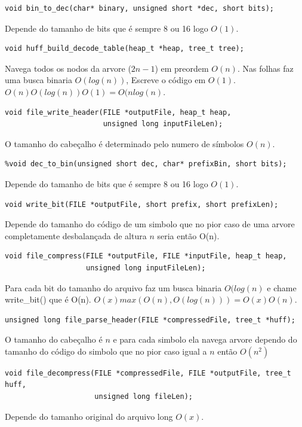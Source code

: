 \documentclass[a4paper, 11pt]{article}
\begin{document}
\begin{verbatim}
void bin_to_dec(char* binary, unsigned short *dec, short bits);
\end{verbatim} 
Depende do tamanho de bits que é sempre 8 ou 16 logo $O(1)$.

\begin{verbatim}
void huff_build_decode_table(heap_t *heap, tree_t tree);
\end{verbatim} 
Navega todos os nodos da arvore ($2n - 1$) em preordem $O(n)$. Nas folhas faz uma busca binaria $O(log(n))$, Escreve o código em $O(1)$. $O(n)O(log(n))O(1) = O(nlog(n)$.

\begin{verbatim}
void file_write_header(FILE *outputFile, heap_t heap, 
                       unsigned long inputFileLen);
\end{verbatim} 
O tamanho do cabeçalho é determinado pelo numero de símbolos $O(n)$.

\begin{verbatim}
%void dec_to_bin(unsigned short dec, char* prefixBin, short bits);
\end{verbatim} 
Depende do tamanho de bits que é sempre 8 ou 16 logo $O(1)$.

\begin{verbatim}
void write_bit(FILE *outputFile, short prefix, short prefixLen);
\end{verbatim} 
Depende do tamanho do código de um simbolo que no pior caso de uma arvore completamente desbalançada de altura $n$ seria então O(n).

\begin{verbatim}
void file_compress(FILE *outputFile, FILE *inputFile, heap_t heap, 
                   unsigned long inputFileLen);
\end{verbatim} 
Para cada bit do tamanho do arquivo faz um busca binaria $O(log(n)$ e chame write\_bit() que é O(n). $O(x)max(O(n), O(log(n))) = O(x)O(n)$.

\begin{verbatim}
unsigned long file_parse_header(FILE *compressedFile, tree_t *huff);
\end{verbatim} 
O tamanho do cabeçalho é $n$ e para cada simbolo ela navega arvore dependo do tamanho do código do simbolo que no pior caso igual a $n$ então $O(n^2)$

\begin{verbatim}
void file_decompress(FILE *compressedFile, FILE *outputFile, tree_t huff, 
                     unsigned long fileLen);
\end{verbatim} 
Depende do tamanho original do arquivo long $O(x)$.
\end{document}
